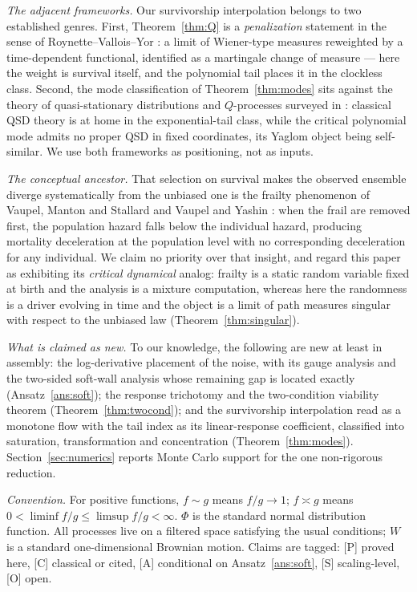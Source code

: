\emph{The adjacent frameworks.} Our survivorship interpolation belongs
to two established genres. First, Theorem~\ref{thm:Q} is a
\emph{penalization} statement in the sense of Roynette--Vallois--Yor
\cite{RVY06}: a limit of Wiener-type measures reweighted by a
time-dependent functional, identified as a martingale change of
measure --- here the weight is survival itself, and the polynomial
tail places it in the clockless class. Second, the mode classification
of Theorem~\ref{thm:modes} sits against the theory of quasi-stationary
distributions and $Q$-processes surveyed in \cite{MV12}: classical QSD
theory is at home in the exponential-tail class, while the critical
polynomial mode admits no proper QSD in fixed coordinates, its Yaglom
object being self-similar. We use both frameworks as positioning, not
as inputs.

\emph{The conceptual ancestor.} That selection on survival makes the
observed ensemble diverge systematically from the unbiased one is the
frailty phenomenon of Vaupel, Manton and Stallard \cite{VMS79} and
Vaupel and Yashin \cite{VY85}: when the frail are removed first, the
population hazard falls below the individual hazard, producing
mortality deceleration at the population level with no corresponding
deceleration for any individual. We claim no priority over that
insight, and regard this paper as exhibiting its \emph{critical
dynamical} analog: frailty is a static random variable fixed at birth
and the analysis is a mixture computation, whereas here the randomness
is a driver evolving in time and the object is a limit of path
measures singular with respect to the unbiased law
(Theorem~\ref{thm:singular}).

\emph{What is claimed as new.} To our knowledge, the following are new
at least in assembly: the log-derivative placement of the noise, with
its gauge analysis and the two-sided soft-wall analysis whose
remaining gap is located exactly (Ansatz~\ref{ans:soft}); the response
trichotomy and the two-condition viability theorem
(Theorem~\ref{thm:twocond}); and the survivorship interpolation read
as a monotone flow with the tail index as its linear-response
coefficient, classified into saturation, transformation and
concentration (Theorem~\ref{thm:modes}). Section~\ref{sec:numerics}
reports Monte Carlo support for the one non-rigorous reduction.

\emph{Convention.} For positive functions, $f\sim g$ means $f/g\to1$;
$f\asymp g$ means $0<\liminf f/g\le\limsup f/g<\infty$. $\Phi$ is the
standard normal distribution function. All processes live on a
filtered space satisfying the usual conditions; $W$ is a standard
one-dimensional Brownian motion. Claims are tagged: [P] proved here,
[C] classical or cited, [A] conditional on Ansatz~\ref{ans:soft},
[S] scaling-level, [O] open.

